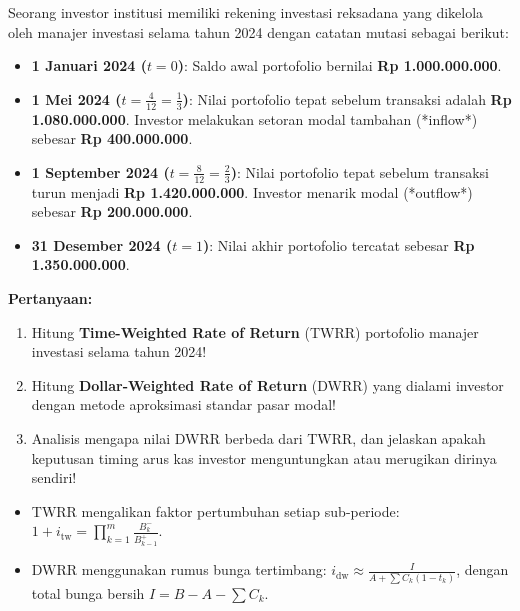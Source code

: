 \documentclass[11pt,a4paper]{article}
\begin{document}
\begin{soalbox}
Seorang investor institusi memiliki rekening investasi reksadana yang dikelola oleh manajer investasi selama tahun 2024 dengan catatan mutasi sebagai berikut:
\begin{itemize}[leftmargin=4mm, topsep=1pt, itemsep=1pt]
    \item \textbf{1 Januari 2024 ($t=0$)}: Saldo awal portofolio bernilai \textbf{Rp 1.000.000.000}.
    \item \textbf{1 Mei 2024 ($t = \frac{4}{12} = \frac{1}{3}$)}: Nilai portofolio tepat sebelum transaksi adalah \textbf{Rp 1.080.000.000}. Investor melakukan setoran modal tambahan (*inflow*) sebesar \textbf{Rp 400.000.000}.
    \item \textbf{1 September 2024 ($t = \frac{8}{12} = \frac{2}{3}$)}: Nilai portofolio tepat sebelum transaksi turun menjadi \textbf{Rp 1.420.000.000}. Investor menarik modal (*outflow*) sebesar \textbf{Rp 200.000.000}.
    \item \textbf{31 Desember 2024 ($t=1$)}: Nilai akhir portofolio tercatat sebesar \textbf{Rp 1.350.000.000}.
\end{itemize}

\textbf{Pertanyaan:}
\begin{enumerate}[label=(\alph*), topsep=1pt, itemsep=1pt]
    \item Hitung \textbf{Time-Weighted Rate of Return} (TWRR) portofolio manajer investasi selama tahun 2024!
    \item Hitung \textbf{Dollar-Weighted Rate of Return} (DWRR) yang dialami investor dengan metode aproksimasi standar pasar modal!
    \item Analisis mengapa nilai DWRR berbeda dari TWRR, dan jelaskan apakah keputusan timing arus kas investor menguntungkan atau merugikan dirinya sendiri!
\end{enumerate}
\end{soalbox}

\begin{petunjukbox}
\begin{itemize}[leftmargin=4mm, topsep=1pt, itemsep=1pt]
    \item TWRR mengalikan faktor pertumbuhan setiap sub-periode: $1 + i_{\text{tw}} = \prod_{k=1}^m \frac{B_k^-}{B_{k-1}^+}$.
    \item DWRR menggunakan rumus bunga tertimbang: $i_{\text{dw}} \approx \frac{I}{A + \sum C_k(1 - t_k)}$, dengan total bunga bersih $I = B - A - \sum C_k$.
\end{itemize}
\end{petunjukbox}
\end{document}
